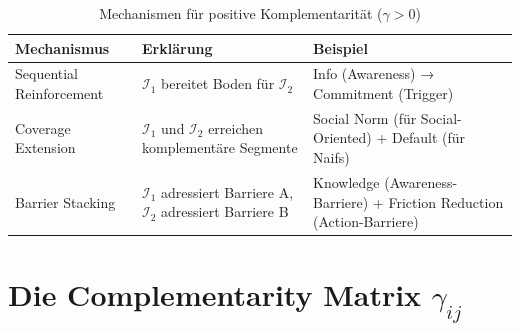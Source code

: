 \begin{table}[htbp]
\centering
\caption{Mechanismen für positive Komplementarität ($\gamma > 0$)}
\label{tab:20-mechanisms}
\renewcommand{\arraystretch}{1.4}
\small
\begin{tabular}{@{}lp{5cm}p{5cm}@{}}
\toprule
\textbf{Mechanismus} & \textbf{Erklärung} & \textbf{Beispiel} \\
\midrule
Sequential Reinforcement & $\mathcal{I}_1$ bereitet Boden für $\mathcal{I}_2$ & Info (Awareness) → Commitment (Trigger) \\
Coverage Extension & $\mathcal{I}_1$ und $\mathcal{I}_2$ erreichen komplementäre Segmente & Social Norm (für Social-Oriented) + Default (für Naifs) \\
Barrier Stacking & $\mathcal{I}_1$ adressiert Barriere A, $\mathcal{I}_2$ adressiert Barriere B & Knowledge (Awareness-Barriere) + Friction Reduction (Action-Barriere) \\
\bottomrule
\end{tabular}
\end{table}


\section{Die Complementarity Matrix $\gamma_{ij}$}
\label{sec:20-complementarity}


